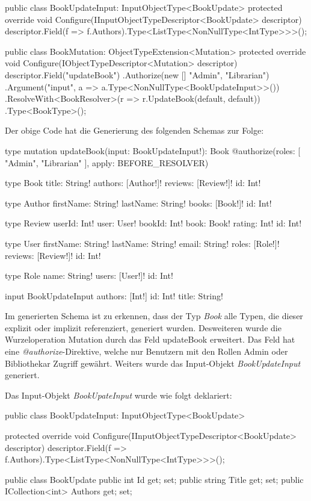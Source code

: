 \begin{JsCode}
public class BookUpdateInput: InputObjectType<BookUpdate> {
    protected override void Configure(IInputObjectTypeDescriptor<BookUpdate> descriptor) {
        descriptor.Field(f => f.Authors).Type<ListType<NonNullType<IntType>>>();
    }
}

public class BookMutation: ObjectTypeExtension<Mutation>{
    protected override void Configure(IObjectTypeDescriptor<Mutation> descriptor) {
        descriptor.Field("updateBook")
            .Authorize(new [] {"Admin", "Librarian"})
            .Argument("input", a => a.Type<NonNullType<BookUpdateInput>>())
            .ResolveWith<BookResolver>(r => r.UpdateBook(default, default))
            .Type<BookType>();
    }
}
\end{JsCode}

Der obige Code hat die Generierung des folgenden Schemas zur Folge:
\begin{JsCode}
type mutation{
    updateBook(input: BookUpdateInput!): Book @authorize(roles: [ "Admin", "Librarian" ], apply: BEFORE_RESOLVER)
}

type Book {
  title: String!
  authors: [Author!]!
  reviews: [Review!]!
  id: Int!
}

type Author {
  firstName: String!
  lastName: String!
  books: [Book!]!
  id: Int!
}

type Review {
  userId: Int!
  user: User!
  bookId: Int!
  book: Book!
  rating: Int!
  id: Int!
}

type User {
  firstName: String!
  lastName: String!
  email: String!
  roles: [Role!]!
  reviews: [Review!]!
  id: Int!
}

type Role {
  name: String!
  users: [User!]!
  id: Int!
}

input BookUpdateInput {
  authors: [Int!]
  id: Int!
  title: String!
}
\end{JsCode}

Im generierten Schema ist zu erkennen, dass der Typ \textit{Book} alle Typen, die dieser explizit oder implizit referenziert, generiert wurden.
Desweiteren wurde die Wurzeloperation Mutation durch das Feld updateBook erweitert.
Das Feld hat eine \textit{@authorize}-Direktive, welche nur Benutzern mit den Rollen Admin oder Bibliothekar Zugriff gewährt.
Weiters wurde das Input-Objekt \textit{BookUpdateInput} generiert.
\newline

Das Input-Objekt \textit{BookUpateInput} wurde wie folgt deklariert:
\begin{JsCode}
public class BookUpdateInput: InputObjectType<BookUpdate> {

    protected override void Configure(IInputObjectTypeDescriptor<BookUpdate> descriptor) {
        descriptor.Field(f => f.Authors).Type<ListType<NonNullType<IntType>>>();
    }
}

public class BookUpdate {
    public int Id { get; set; }
    public string Title { get; set; }
    public ICollection<int> Authors { get; set; }
}
\end{JsCode}

